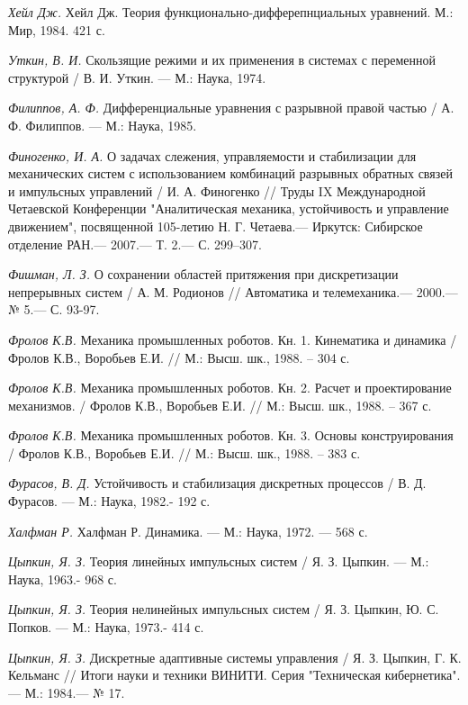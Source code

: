 \begin{thebibliography}{10}
	{\it Хейл Дж.} Хейл Дж. Теория функционально-дифферепнциальных уравнений. М.: Мир,
	1984. 421 с.
	
	{\it Уткин, В. И.} Скользящие режими и их применения в системах с переменной структурой /
	В. И. Уткин. — М.: Наука, 1974.
	
	{\it Филиппов, А. Ф.} Дифференциальные уравнения с разрывной правой частью /
	А. Ф. Филиппов. — М.: Наука, 1985.
	
	{\it Финогенко, И. А.} О задачах слежения, управляемости и стабилизации для механических систем с использованием комбинаций разрывных обратных связей и импульсных управлений /
	И. А. Финогенко // Труды IX Международной Четаевской Конференции "Аналитическая механика, устойчивость и управление движением", посвященной 105-летию Н. Г. Четаева.— Иркутск: Сибирское отделение РАН.— 2007.— Т. 2.— С. 299–307.
	
	{\it Фишман, Л. З.} О сохранении областей притяжения при дискретизации непрерывных систем
	/ А. М. Родионов // Автоматика и телемеханика.— 2000.— № 5.— С. 93-97.
	
	{\it Фролов К.В.} Механика промышленных роботов. Кн. 1. Кинематика и динамика / Фролов К.В., Воробьев Е.И. // М.: Высш. шк., 1988. – 304 с.
	
	{\it Фролов К.В.} Механика промышленных роботов. Кн. 2. Расчет и проектирование механизмов. / Фролов К.В., Воробьев Е.И. // М.: Высш. шк., 1988. – 367 с.
	
	{\it Фролов К.В.} Механика промышленных роботов. Кн. 3. Основы конструирования / Фролов К.В., Воробьев Е.И. // М.: Высш. шк., 1988. – 383 с.
	
	{\it Фурасов, В. Д.} Устойчивость и стабилизация дискретных процессов /
	В. Д. Фурасов. — М.: Наука, 1982.- 192 с.
	
	{\it Халфман Р.} Халфман Р. Динамика. — М.: Наука, 1972. — 568 с.
	
	{\it Цыпкин, Я. З.} Теория линейных импульсных систем /
	Я. З. Цыпкин. — М.: Наука, 1963.- 968 с.
	
	{\it Цыпкин, Я. З.} Теория нелинейных импульсных систем /
	Я. З. Цыпкин, Ю. С. Попков. — М.: Наука, 1973.- 414 с.
	
	{\it Цыпкин, Я. З.} Дискретные адаптивные системы управления /
	Я. З. Цыпкин, Г. К. Кельманс // Итоги науки и техники ВИНИТИ. Серия "Техническая кибернетика". — М.: 1984.— № 17.
	

\end{thebibliography}
